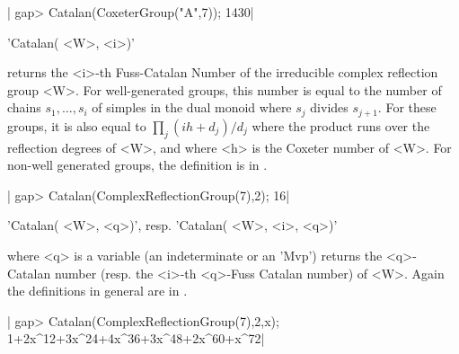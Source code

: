 |    gap> Catalan(CoxeterGroup("A",7));
    1430|

'Catalan( <W>, <i>)'

returns   the  <i>-th  Fuss-Catalan  Number   of  the  irreducible  complex
reflection  group <W>. For  well-generated groups, this  number is equal to
the  number of chains $s_1,\ldots,s_i$ of  simples in the dual monoid where
$s_j$   divides  $s_{j+1}$.  For   these  groups,  it   is  also  equal  to
$\prod_j(ih+d_j)/d_j$ where the product runs over the reflection degrees of
<W>,  and where <h>  is the Coxeter  number of <W>.  For non-well generated
groups, the definition is in \cite{gg12}.

|    gap> Catalan(ComplexReflectionGroup(7),2);
    16|

'Catalan( <W>, <q>)', resp. 'Catalan( <W>, <i>, <q>)'

where  <q>  is  a  variable  (an  indeterminate  or  an  'Mvp') returns the
<q>-Catalan number (resp. the <i>-th <q>-Fuss Catalan number) of <W>. Again
the definitions in general are in \cite{gg12}.

|    gap> Catalan(ComplexReflectionGroup(7),2,x);
    1+2x^12+3x^24+4x^36+3x^48+2x^60+x^72|
